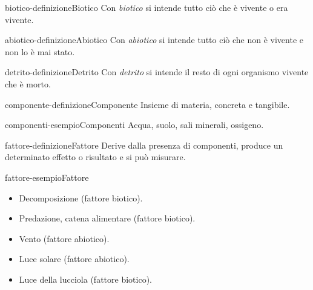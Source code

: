 \documentclass[preview]{standalone}
\begin{document}
\begin{snippetdefinition}{biotico-definizione}{Biotico}
    Con \textit{biotico} si intende tutto ciò che è vivente o era vivente.
\end{snippetdefinition}

\begin{snippetdefinition}{abiotico-definizione}{Abiotico}
    Con \textit{abiotico} si intende tutto ciò che non è vivente e non lo è mai stato.
\end{snippetdefinition}

\begin{snippetdefinition}{detrito-definizione}{Detrito}
    Con \textit{detrito} si intende il resto di ogni organismo vivente che è morto.
\end{snippetdefinition}


\begin{snippetdefinition}{componente-definizione}{Componente}
    Insieme di materia, concreta e tangibile.
\end{snippetdefinition}

\begin{snippetexample}{componenti-esempio}{Componenti}
    Acqua, suolo, sali minerali, ossigeno.
\end{snippetexample}

\begin{snippetdefinition}{fattore-definizione}{Fattore}
    Derive dalla presenza di componenti, produce un determinato effetto o risultato e si può misurare.
\end{snippetdefinition}

\begin{snippetexample}{fattore-esempio}{Fattore}
    \begin{itemize}
        \item Decomposizione (fattore biotico).
        \item Predazione, catena alimentare (fattore biotico).
        \item Vento (fattore abiotico).
        \item Luce solare (fattore abiotico).
        \item Luce della lucciola (fattore biotico).
    \end{itemize}
\end{snippetexample}
\end{document}
